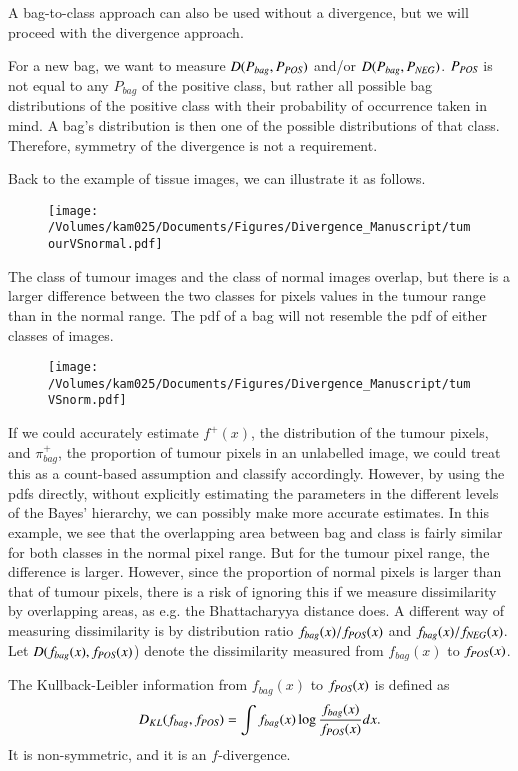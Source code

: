 A bag-to-class approach can also be used without a divergence, but we will proceed with the divergence approach. 

For a new bag, we want to measure $D(P_{bag},P_{\text{\scriptsize{{\it POS}}}})$ and/or $D(P_{bag},P_{\text{\scriptsize{{\it NEG}}}})$.
$P_{\text{\scriptsize{{\it POS}}}}$ is not equal to any $P_{bag}$ of the positive class, but rather all possible bag distributions of the positive class with their probability of occurrence taken in mind. 
A bag's distribution is then one of the possible distributions of that class. 
Therefore, symmetry of the divergence is not a requirement.

Back to the example of tissue images, we can illustrate it as follows. 
\begin{figure}[!h]
  \centering
    \texttt{[image: /Volumes/kam025/Documents/Figures/Divergence\_Manuscript/tumourVSnormal.pdf]}
\end{figure}
The class of tumour images and the class of normal images overlap, but there is a larger difference between the two classes for pixels values in the tumour range than in the normal range. 
The pdf of a bag will not resemble the pdf of either classes of images. 
\begin{figure}[!h]
  \centering
    \texttt{[image: /Volumes/kam025/Documents/Figures/Divergence\_Manuscript/tumVSnorm.pdf]}
\end{figure}

If we could accurately estimate $f^+(x)$, the distribution of the tumour pixels, and $\pi_{bag}^+$, the proportion of tumour pixels in an unlabelled image, we could treat this as a count-based assumption and classify accordingly. 
However, by using the pdfs directly, without explicitly estimating the parameters in the different levels of the Bayes' hierarchy, we can possibly make more accurate estimates. 
In this example, we see that the overlapping area between bag and class is fairly similar for both classes in the normal pixel range. 
But for the tumour pixel range, the difference is larger. 
However, since the proportion of normal pixels is larger than that of tumour pixels, there is a risk of ignoring this if we measure dissimilarity by overlapping areas, as e.g. the Bhattacharyya distance does.
A different way of measuring dissimilarity is by distribution ratio $f_{bag}(x) /f_{\text{\scriptsize{{\it POS}}}}(x)$ and $f_{bag}(x) /f_{\text{\scriptsize{{\it NEG}}}}(x)$.
Let $D(f_{bag}(x), f_{\text{\scriptsize{{\it POS}}}}(x)$) denote the dissimilarity measured from $f_{bag}(x)$ to $f_{\text{\scriptsize{{\it POS}}}}(x)$.

The Kullback-Leibler information from $f_{bag}(x)$ to $f_{\text{\scriptsize{{\it POS}}}}(x)$ is defined as
\begin{align}
  D_{KL}(f_{bag},f_{\text{\scriptsize{{\it POS}}}}) = \int f_{bag}(x) \log \frac{f_{bag}(x)}{f_{\text{\scriptsize{{\it POS}}}} (x)} dx.
\end{align}
It is non-symmetric, and it is an $f$-divergence. 


